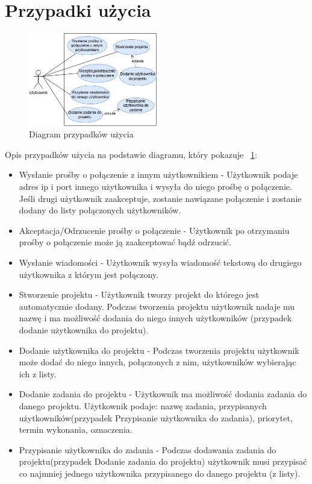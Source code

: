 \section{Przypadki użycia}
\begin{figure}[!ht]
	\centering
		\includegraphics[width=0.5\textwidth]{Images/PrzypadkiUzycia.png}
	\caption{Diagram przypadków użycia}
	\label{fig:PrzypadkiUzycia}
\end{figure}
Opis przypadków użycia na podstawie diagramu, który pokazuje \figurename{~\ref{fig:PrzypadkiUzycia}}:
\begin{itemize}
\item {Wysłanie prośby o połączenie z innym użytkownikiem} - Użytkownik podaje adres ip i port innego użytkownika i wysyła do niego prośbę o połączenie. Jeśli drugi użytkownik zaakceptuje, zostanie nawiązane połączenie i zostanie dodany do listy połączonych użytkowników.
\item {Akceptacja/Odrzucenie prośby o połączenie} - Użytkownik po otrzymaniu prośby o połączenie może ją zaakceptować bądź odrzucić.
\item {Wysłanie wiadomości} - Użytkownik wysyła wiadomość tekstową do drugiego użytkownika z którym jest połączony.
\item {Stworzenie projektu} - Użytkownik tworzy projekt do którego jest automatycznie dodany. Podczas tworzenia projektu użytkownik nadaje mu nazwę i ma możliwość dodania do niego innych użytkowników (przypadek dodanie użytkownika do projektu).
\item {Dodanie użytkownika do projektu} - Podczas tworzenia projektu użytkownik może dodać do niego innych, połączonych z nim, użytkowników wybierając ich z listy.
\item {Dodanie zadania do projektu} - Użytkownik ma możliwość dodania zadania do danego projektu. Użytkownik podaje: nazwę zadania, przypisanych użytkowników(przypadek Przypisanie użytkownika do zadania), priorytet, termin wykonania, oznaczenia.
\item {Przypisanie użytkownika do zadania} - Podczas dodawania zadania do projektu(przypadek Dodanie zadania do projektu) użytkownik musi przypisać co najmniej jednego użytkownika przypisanego do danego projektu (z listy).
\end{itemize}

